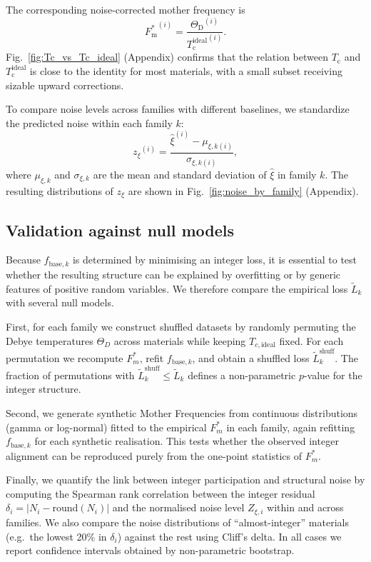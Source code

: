 \documentclass[aps,prb,twocolumn,superscriptaddress,floatfix,nofootinbib]{revtex4-2}
\newcommand{\Tc}{\ensuremath{T_{\mathrm{c}}}}
\newcommand{\Tcone}{\ensuremath{{T_{\mathrm{c}}^{\mathrm{ideal}}}}}
\newcommand{\ThetaD}{\ensuremath{\Theta_{\mathrm{D}}}}
\newcommand{\Fmstar}{\ensuremath{{F_{\mathrm{m}}^{\ast}}}}
\newcommand{\znoise}{\ensuremath{{z_{\xi}}}}
\newcommand{\figref}[1]{Fig.~\ref{#1}}
\begin{document}
The corresponding noise-corrected mother frequency is
\begin{equation}
  \label{eq:Fm_star}
  \Fmstar^{(i)} = \frac{\ThetaD^{(i)}}{\Tcone^{(i)}}.
\end{equation}
\figref{fig:Tc_vs_Tc_ideal} (Appendix) confirms that the relation
between $\Tc$ and $\Tcone$ is close to the identity for most materials,
with a small subset receiving sizable upward corrections.

To compare noise levels across families with different baselines,
we standardize the predicted noise within each family $k$:
\begin{equation}
  \label{eq:z_noise}
  \znoise^{(i)} =
  \frac{\widehat{\xi}^{(i)} - \mu_{\xi,k(i)}}{\sigma_{\xi,k(i)}},
\end{equation}
where $\mu_{\xi,k}$ and $\sigma_{\xi,k}$ are the mean and
standard deviation of $\widehat{\xi}$ in family $k$.
The resulting distributions of $\znoise$ are shown in
\figref{fig:noise_by_family} (Appendix).

\subsection{Validation against null models}\label{sec:integer_validation}

Because \(f_{\mathrm{base},k}\) is determined by minimising an integer loss,
it is essential to test whether the resulting structure can be explained by
overfitting or by generic features of positive random variables. We therefore
compare the empirical loss \(\tilde L_k\) with several null models.

First, for each family we construct shuffled datasets by randomly permuting
the Debye temperatures \(\Theta_D\) across materials while keeping
\(T_{c,\mathrm{ideal}}\) fixed. For each permutation we recompute
\(F_m^*\), refit \(f_{\mathrm{base},k}\), and obtain a shuffled loss
\(\tilde L_k^{\mathrm{shuff}}\). The fraction of permutations with
\(\tilde L_k^{\mathrm{shuff}} \le \tilde L_k\) defines a non-parametric
\(p\)-value for the integer structure.

Second, we generate synthetic Mother Frequencies from continuous
distributions (gamma or log-normal) fitted to the empirical \(F_m^*\) in
each family, again refitting \(f_{\mathrm{base},k}\) for each synthetic
realisation. This tests whether the observed integer alignment can be
reproduced purely from the one-point statistics of \(F_m^*\).

Finally, we quantify the link between integer participation and structural
noise by computing the Spearman rank correlation between the integer
residual
\(\delta_i = |N_i - \mathrm{round}(N_i)|\) and the normalised noise level
\(Z_{\xi,i}\) within and across families. We also compare the noise
distributions of ``almost-integer'' materials (e.g.\ the lowest 20\% in
\(\delta_i\)) against the rest using Cliff’s delta. In all cases we report
confidence intervals obtained by non-parametric bootstrap.
\end{document}
